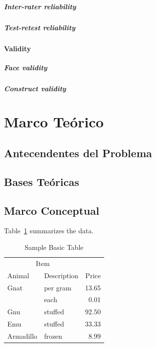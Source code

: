 \documentclass[doc, 12pt, a4paper, draftall]{apa7} %
\begin{document}
\lipsum[9]

\subparagraph{Inter-rater reliability}
\lipsum[10]

\subparagraph{Test-retest reliability}
\lipsum[11]

\paragraph{Validity}
\lipsum[12]

\subparagraph{Face validity}
\lipsum[13]

\subparagraph{Construct validity}
\lipsum[14]

\section{Marco Teórico}

\subsection{Antecendentes del Problema}

\lipsum[15]

\lipsum[15]

\subsection{Bases Teóricas}

\lipsum[2]

\subsection{Marco Conceptual}

Table~\ref{tab:BasicTable} summarizes the data. \lipsum[15]

\begin{table}
  \caption{Sample Basic Table}
  \label{tab:BasicTable}
  \begin{tabular}{@{}llr@{}}         \toprule
  \multicolumn{2}{c}{Item}        \\ \cmidrule(r){1-2}
  Animal    & Description & Price \\ \midrule
  Gnat      & per gram    & 13.65 \\
            & each        &  0.01 \\
  Gnu       & stuffed     & 92.50 \\
  Emu       & stuffed     & 33.33 \\
  Armadillo & frozen      &  8.99 \\ \bottomrule
  \end{tabular}
\end{table}
\end{document}

